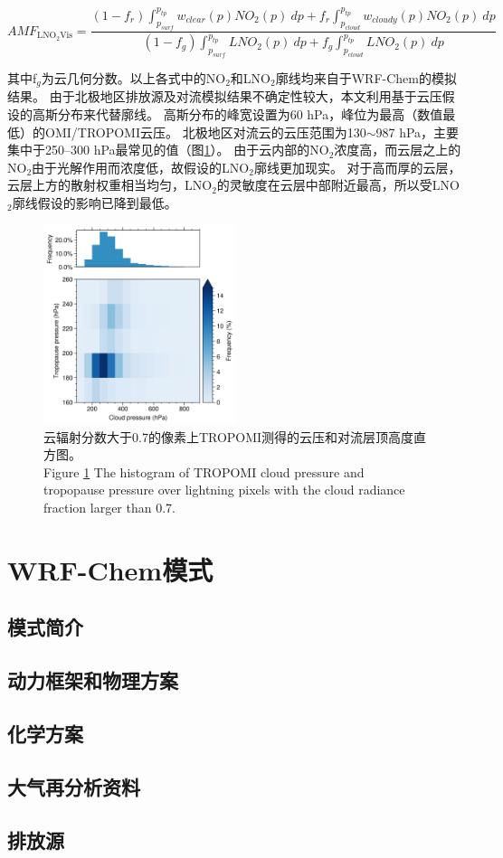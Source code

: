 \begin{equation} \label{eq:AMF_LNO2Vis}
AMF_{\textrm{LNO$_2$Vis}} = \frac{(1-f_r) \int_{p_{surf}}^{p_{tp}} w_{clear}(p) NO_2(p) \: dp + f_r \int_{p_{cloud}}^{p_{tp}} w_{cloudy}(p) NO_2(p) \: dp}{(1-f_g) \int_{p_{surf}}^{p_{tp}} LNO_2(p) \: dp + f_g \int_{p_{cloud}}^{p_{tp}} LNO_2(p) \: dp}
\end{equation}

其中f$_g$为云几何分数。以上各式中的NO$_2$和LNO$_2$廓线均来自于WRF-Chem的模拟结果。
由于北极地区排放源及对流模拟结果不确定性较大，本文利用基于云压假设的高斯分布来代替廓线。
高斯分布的峰宽设置为60 hPa，峰位为最高（数值最低）的OMI/TROPOMI云压。
北极地区对流云的云压范围为130$\sim$987 hPa，主要集中于250--300 hPa最常见的值（图\ref{fig:pcld_ptropo}）。
由于云内部的NO$_2$浓度高，而云层之上的NO$_2$由于光解作用而浓度低，故假设的LNO$_2$廓线更加现实\citep{Beirle.2009}。
对于高而厚的云层，云层上方的散射权重相当均匀，LNO$_2$的灵敏度在云层中部附近最高，所以受LNO$_2$廓线假设的影响已降到最低\citep{Laughner.2017}。

\begin{figure}[htbp]
\centering
\includegraphics[width=0.5\textwidth]{./figures/pcld_ptropo.png}
\caption{云辐射分数大于0.7的像素上TROPOMI测得的云压和对流层顶高度直方图。\\
Figure \ref{fig:pcld_ptropo} The histogram of TROPOMI cloud pressure and tropopause pressure over lightning
pixels with the cloud radiance fraction larger than 0.7.
}
\label{fig:pcld_ptropo}
\end{figure}

\section{WRF-Chem模式}

\subsection{模式简介}

\subsection{动力框架和物理方案}

\subsection{化学方案}

\subsection{大气再分析资料}

\subsection{排放源}

